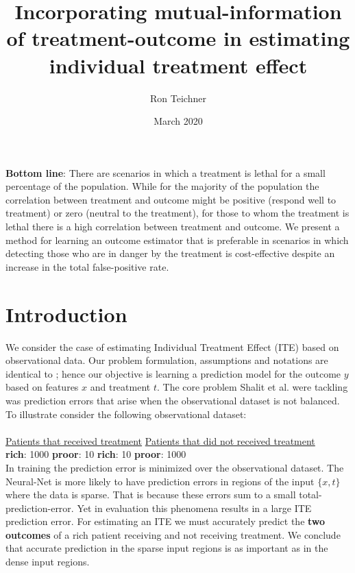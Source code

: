 \documentclass[oneside,12pt]{article}
\title{Incorporating mutual-information of treatment-outcome in estimating individual treatment effect}
\author{Ron Teichner}
\date{March 2020}
\begin{document}
%
\maketitle
%
    {\textbf{Bottom line}: There are scenarios in which a treatment is lethal for a small percentage of the population. While for the majority of the population the correlation between treatment and outcome might be positive (respond well to treatment) or zero (neutral to the treatment), for those to whom the treatment is lethal there is a high correlation between treatment and outcome. We present a method for learning an outcome estimator that is preferable in scenarios in which detecting those who are in danger by the treatment is cost-effective despite an increase in the total false-positive rate.}
%
\tableofcontents
%
\pagebreak
%
\section{Introduction}\label{sec:intro}
%
We consider the case of estimating Individual Treatment Effect (ITE) based on observational data. Our problem formulation, assumptions and notations are identical to \cite{pmlr-v70-shalit17a}; hence our objective is learning a prediction model for the outcome $y$ based on features $x$ and treatment $t$. The core problem Shalit et al. were tackling was prediction errors that arise when the observational dataset is not balanced. To illustrate consider the following observational dataset:\\\\
%
\underline{Patients that received treatment} \quad \quad \quad \underline{Patients that did not received treatment}\\
\textbf{rich}: 1000 \quad \textbf{proor}: 10 \quad \quad \quad \quad \quad \quad \quad \textbf{rich}: 10 \quad \textbf{proor}: 1000\\

In training the prediction error is minimized over the observational dataset. The Neural-Net is more likely to have prediction errors in regions of the input $\{x,t\}$ where the data is sparse. That is because these errors sum to a small total-prediction-error. Yet in evaluation this phenomena results in a large ITE prediction error. For estimating an ITE we must accurately predict the \textbf{two outcomes} of a rich patient receiving and not receiving treatment. We conclude that accurate prediction in the sparse input regions is as important as in the dense input regions.\\
\end{document}
